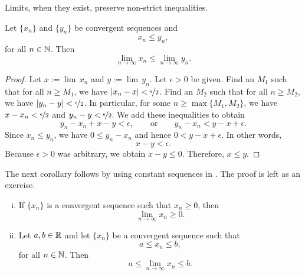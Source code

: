 Limits, when they exist, preserve non-strict inequalities.

\begin{lemma} \label{limandineq:lemma}
Let $\{ x_n \}$ and $\{ y_n \}$ be
convergent sequences and
\begin{equation*}
x_n \leq y_n ,
\end{equation*}
for all $n \in {\mathbb{N}}$.  Then
\begin{equation*}
\lim_{n\to\infty} x_n \leq
\lim_{n\to\infty} y_n .
\end{equation*}
\end{lemma}

\begin{proof}
Let $x := \lim\, x_n$ and $y := \lim\, y_n$. 
Let 
$\epsilon > 0$ be given.  Find an $M_1$ such that for all $n \geq M_1$,
we have $\left\lvert {x_n-x} \right\rvert < \nicefrac{\epsilon}{2}$.  Find an $M_2$ such that
for all $n \geq M_2$, we have
$\left\lvert {y_n-y} \right\rvert < \nicefrac{\epsilon}{2}$.  In particular,
for some $n \geq \max\{ M_1, M_2 \}$, we have
$x-x_n < \nicefrac{\epsilon}{2}$ and
$y_n-y < \nicefrac{\epsilon}{2}$.  We add these inequalities to
obtain
\begin{equation*}
y_n-x_n+x-y < \epsilon, \qquad \text{or} \qquad
y_n-x_n < y-x+ \epsilon .
\end{equation*}
Since $x_n \leq y_n$, we have
$0 \leq y_n-x_n$ and hence $0 < y-x+ \epsilon$.
In other words,
\begin{equation*}
x-y < \epsilon .
\end{equation*}
Because $\epsilon > 0$ was arbitrary, we obtain
$x-y \leq 0$.
Therefore, $x \leq y$.
\end{proof}

The next corollary follows by
using constant sequences in
.  The proof is left as an exercise.

\begin{samepage}
\begin{cor} \label{limandineq:cor}
\leavevmode
\begin{enumerate}[(i)]
\item If $\{ x_n \}$ is a convergent sequence such that $x_n \geq 0$,
then
\begin{equation*}
\lim_{n\to\infty} x_n \geq 0.
\end{equation*}
\item
Let $a,b \in {\mathbb{R}}$ and
let $\{ x_n \}$ be a convergent sequence such that
\begin{equation*}
a \leq x_n \leq b ,
\end{equation*}
for all $n \in {\mathbb{N}}$.  Then
\begin{equation*}
a \leq \lim_{n\to\infty} x_n \leq b.
\end{equation*}
\end{enumerate}
\end{cor}
\end{samepage}

